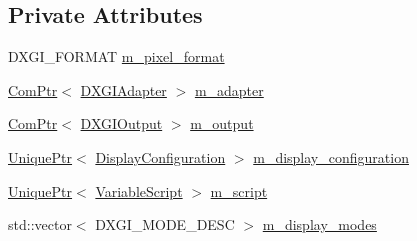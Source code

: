 \subsection*{Private Attributes}
\begin{DoxyCompactItemize}
\item 
D\+X\+G\+I\+\_\+\+F\+O\+R\+M\+AT \hyperlink{classmage_1_1rendering_1_1_display_configurator_1_1_impl_a87d52e7bc1a1e4fe9786b3b0ec3fc1e1}{m\+\_\+pixel\+\_\+format}
\item 
\hyperlink{namespacemage_ae74f374780900893caa5555d1031fd79}{Com\+Ptr}$<$ \hyperlink{namespacemage_1_1rendering_ad55e028ebd705b547eeb972ad8d03b6a}{D\+X\+G\+I\+Adapter} $>$ \hyperlink{classmage_1_1rendering_1_1_display_configurator_1_1_impl_a49b407f044b7e34f9b58dbd86648bb46}{m\+\_\+adapter}
\item 
\hyperlink{namespacemage_ae74f374780900893caa5555d1031fd79}{Com\+Ptr}$<$ \hyperlink{namespacemage_1_1rendering_aaf22d3893277a4bd8497f6ea69b01532}{D\+X\+G\+I\+Output} $>$ \hyperlink{classmage_1_1rendering_1_1_display_configurator_1_1_impl_accf774307783109a1e885efc5ec19a90}{m\+\_\+output}
\item 
\hyperlink{namespacemage_a3316d7143a973e37adf1110f2e80ca31}{Unique\+Ptr}$<$ \hyperlink{classmage_1_1rendering_1_1_display_configuration}{Display\+Configuration} $>$ \hyperlink{classmage_1_1rendering_1_1_display_configurator_1_1_impl_a445c59ccde512df51bb77b9aaa2ecb23}{m\+\_\+display\+\_\+configuration}
\item 
\hyperlink{namespacemage_a3316d7143a973e37adf1110f2e80ca31}{Unique\+Ptr}$<$ \hyperlink{classmage_1_1_variable_script}{Variable\+Script} $>$ \hyperlink{classmage_1_1rendering_1_1_display_configurator_1_1_impl_aa11b99f1bdf03e3d1eee4d4907479c45}{m\+\_\+script}
\item 
std\+::vector$<$ D\+X\+G\+I\+\_\+\+M\+O\+D\+E\+\_\+\+D\+E\+SC $>$ \hyperlink{classmage_1_1rendering_1_1_display_configurator_1_1_impl_ae04d4e1430c684cb0961f838d040f6e1}{m\+\_\+display\+\_\+modes}
\end{DoxyCompactItemize}

